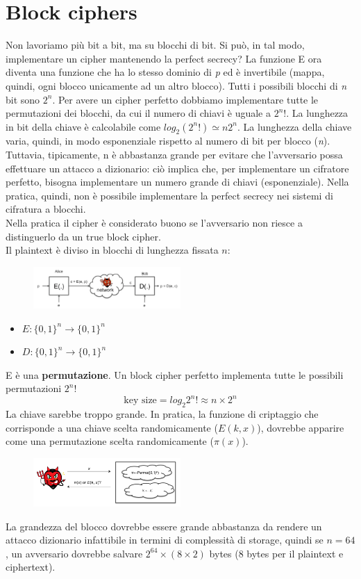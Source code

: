 \documentclass[a4paper,12pt]{article}
\begin{document}
\section{Block ciphers}
Non lavoriamo più bit a bit, ma su blocchi di bit. Si può, in tal modo, implementare un cipher mantenendo la perfect secrecy?
La funzione E ora diventa una funzione che ha lo stesso dominio di \textit{p} ed è invertibile (mappa, quindi, ogni blocco unicamente ad un altro blocco).
Tutti i possibili blocchi di \textit{n} bit sono $2^{n}$. Per avere un cipher perfetto dobbiamo implementare tutte le permutazioni dei blocchi, da cui il numero di chiavi è uguale a $2^{n}!$.
La lunghezza in bit della chiave è calcolabile come $log_2 (2^{n}!) \simeq n2^{n}$.
La lunghezza della chiave varia, quindi, in modo esponenziale rispetto al numero di bit per blocco (\textit{n}). \\
Tuttavia, tipicamente, n è abbastanza grande per evitare che l'avversario possa effettuare un attacco a dizionario: ciò implica che, per implementare un cifratore perfetto,
bisogna implementare un numero grande di chiavi (esponenziale). Nella pratica, quindi, non è possibile implementare la perfect secrecy nei sistemi di cifratura a blocchi. \\
Nella pratica il cipher è considerato buono se l'avversario non riesce a distinguerlo da un true block cipher. \\
Il plaintext è diviso in blocchi di lunghezza fissata $n$:
\begin{figure}[H]
  \centering
  \includegraphics[width=0.5\textwidth]{img/block-cipher}
\end{figure}

\begin{itemize}
	\item $E : \{0,1\}^n \rightarrow \{0,1\}^n$
	\item $D : \{0,1\}^n \rightarrow \{0,1\}^n$
\end{itemize}
E è una \textbf{permutazione}.
Un block cipher perfetto implementa tutte le possibili permutazioni $2^{n}!$
$$\text{key size} = log_2 2^n! \approx n \times 2^n$$
La chiave sarebbe troppo grande.
In pratica, la funzione di criptaggio che corrisponde a una chiave scelta randomicamente ($E(k, x)$), dovrebbe apparire come una permutazione scelta randomicamente ($\pi(x)$).
\begin{figure}[H]
  \centering
  \includegraphics[width=0.5\textwidth]{img/perm}
\end{figure}
La grandezza del blocco dovrebbe essere grande abbastanza da rendere un attacco dizionario infattibile in termini di complessità di storage, quindi se $n = 64$, un avversario dovrebbe salvare $2^{64} \times (8 \times 2)$ bytes (8 bytes per il plaintext e ciphertext).
\end{document}
